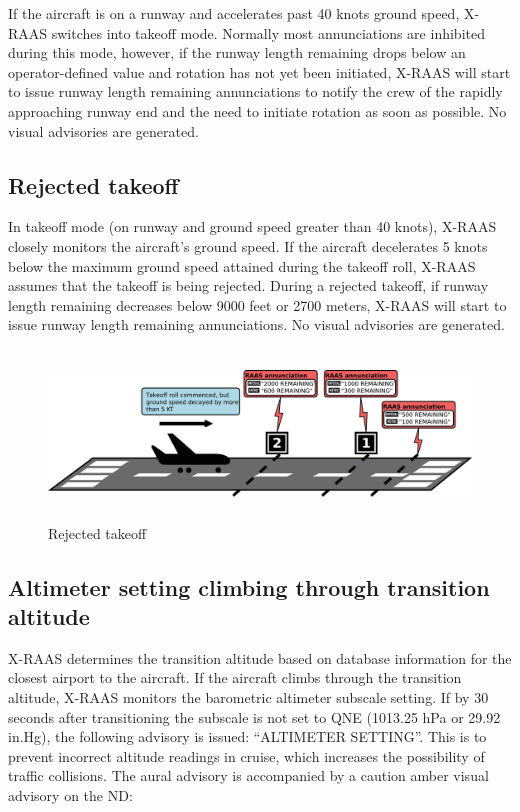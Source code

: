 \documentclass[a4paper,12pt]{article}
\begin{document}
If the aircraft is on a runway and accelerates past 40 knots ground
speed, X-RAAS switches into takeoff mode. Normally most annunciations are
inhibited during this mode, however, if the runway length remaining drops
below an operator-defined value and rotation has not yet been initiated,
X-RAAS will start to issue runway length remaining annunciations to
notify the crew of the rapidly approaching runway end and the need to
initiate rotation as soon as possible. No visual advisories are
generated.

\subsection{Rejected takeoff}
\label{subsec:RejectedTakeoffMon}

In takeoff mode (on runway and ground speed greater than 40 knots),
X-RAAS closely monitors the aircraft's ground speed. If the aircraft
decelerates 5 knots below the maximum ground speed attained during the
takeoff roll, X-RAAS assumes that the takeoff is being rejected. During a
rejected takeoff, if runway length remaining decreases below 9000 feet or
2700 meters, X-RAAS will start to issue runway length remaining
annunciations.  No visual advisories are generated.

\begin{figure}[H]
\begin{center}
\includegraphics[height=4.5cm]{../src/takeoff_rejected.pdf}
\end{center}
\caption{Rejected takeoff}
\end{figure}

\newpage
\subsection{Altimeter setting climbing through transition altitude}
\label{subsec:AltmQNEMon}

X-RAAS determines the transition altitude based on database information
for the closest airport to the aircraft. If the aircraft climbs through
the transition altitude, X-RAAS monitors the barometric altimeter
subscale setting. If by 30 seconds after transitioning the subscale is
not set to QNE (1013.25 hPa or 29.92 in.Hg), the following advisory is
issued: ``ALTIMETER SETTING''. This is to prevent incorrect altitude
readings in cruise, which increases the possibility of traffic
collisions. The aural advisory is accompanied by a caution amber visual
advisory on the ND:
\end{document}
